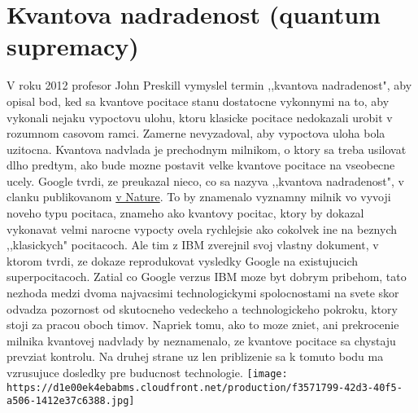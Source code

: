 \documentclass[year=2021]{article}
\begin{document}
\section{Kvantova nadradenost (quantum supremacy)}
V roku 2012 profesor John Preskill vymyslel termin ,,kvantova nadradenost", aby opisal bod, ked sa kvantove pocitace stanu dostatocne vykonnymi na to, aby vykonali nejaku vypoctovu ulohu, ktoru klasicke pocitace nedokazali urobit v rozumnom casovom ramci. Zamerne nevyzadoval, aby vypoctova uloha bola uzitocna. Kvantova nadvlada je prechodnym milnikom, o ktory sa treba usilovat dlho predtym, ako bude mozne postavit velke kvantove pocitace na vseobecne ucely.
\bigbreak
Google tvrdi, ze preukazal nieco, co sa nazyva ,,kvantova nadradenost", v clanku publikovanom \href{https://www.nature.com/articles/s41586-019-1666-5}{v Nature}. To by znamenalo vyznamny milnik vo vyvoji noveho typu pocitaca, znameho ako kvantovy pocitac, ktory by dokazal vykonavat velmi narocne vypocty ovela rychlejsie ako cokolvek ine na beznych ,,klasickych" pocitacoch. Ale tim z IBM zverejnil svoj vlastny dokument, v ktorom tvrdi, ze dokaze reprodukovat vysledky Google na existujucich superpocitacoch.
\bigbreak
Zatial co Google verzus IBM moze byt dobrym pribehom, tato nezhoda medzi dvoma najvacsimi technologickymi spolocnostami na svete skor odvadza pozornost od skutocneho vedeckeho a technologickeho pokroku, ktory stoji za pracou oboch timov. Napriek tomu, ako to moze zniet, ani prekrocenie milnika kvantovej nadvlady by neznamenalo, ze kvantove pocitace sa chystaju prevziat kontrolu. Na druhej strane uz len priblizenie sa k tomuto bodu ma vzrusujuce dosledky pre buducnost technologie.
\bigbreak
\bigbreak
\texttt{[image: https://d1e00ek4ebabms.cloudfront.net/production/f3571799-42d3-40f5-a506-1412e37c6388.jpg]}
\bigbreak
\end{document}
